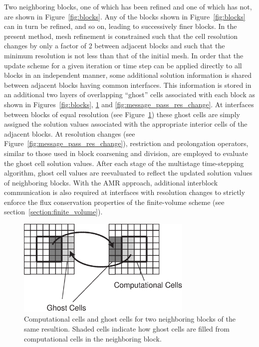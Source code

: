 Two neighboring blocks, one of which has been refined and one of which has not,
are shown in Figure~\ref{fig:blocks}.  Any of the blocks shown in
Figure~\ref{fig:blocks} can in turn be refined, and so on, leading to successively
finer blocks. In the present method, mesh refinement is constrained such that the
cell resolution changes by only a factor of 2 between adjacent blocks and such
that the minimum resolution is not less than that of the initial mesh.
In order that the update scheme for a given iteration or time step can be
applied directly to all blocks in an independent manner, some additional
solution information is shared between adjacent blocks having common
interfaces.  This information is stored in an additional two layers of
overlapping ``ghost'' cells associated with each block  as shown in
Figures~\ref{fig:blocks}, \ref{fig:message_pass_equal} and 
\ref{fig:message_pass_res_change}.  At interfaces between blocks of
equal 
resolution (see Figure~\ref{fig:message_pass_equal}) these
ghost cells are simply assigned the solution values associated with the
appropriate interior cells of the adjacent blocks.  At resolution
changes (see Figure~\ref{fig:message_pass_res_change}),
restriction and prolongation operators, similar to those used in block
coarsening and division, are employed to evaluate the ghost cell solution
values.  After each stage of the multistage time-stepping algorithm, ghost
cell values are reevaluated to reflect the updated solution values of
neighboring blocks.  With the AMR approach, additional interblock
communication is also required at interfaces with resolution changes to
strictly enforce the flux conservation properties of the finite-volume
scheme (see section~\ref{section:finite_volume}).
\begin{figure}
\begin{center}
\includegraphics*[width=8.4cm]{message_pass_equal.eps}
\end{center}
\caption{Computational cells and ghost cells for two
neighboring blocks of the same resultion.  Shaded cells indicate
how ghost cells are filled from computational cells in the neighboring block.}
\label{fig:message_pass_equal}
\end{figure}

